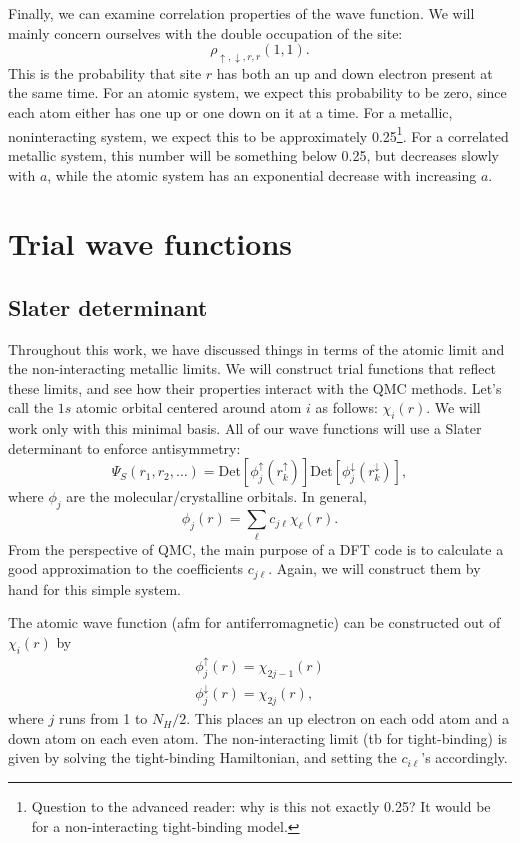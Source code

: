 \documentclass[12pt]{article}
\begin{document}
Finally, we can examine correlation properties of the wave function.
We will mainly concern ourselves with the double occupation of the site:
\begin{equation}
\rho_{\uparrow,\downarrow,r,r}(1,1).	
\end{equation}
This is the probability that site $r$ has both an up and down electron present at the same time.
For an atomic system, we expect this probability to be zero, since each atom either has one up or one down on it at a time.
For a metallic, noninteracting system, we expect this to be approximately 0.25\footnote{Question to the advanced reader: why is this not exactly 0.25? It would be for a non-interacting tight-binding model.}.
For a correlated metallic system, this number will be something below 0.25, but decreases slowly with $a$, while the atomic system has an exponential decrease with increasing $a$.


\section*{Trial wave functions}

\subsection*{Slater determinant} 
Throughout this work, we have discussed things in terms of the atomic limit and the non-interacting metallic limits.
We will construct trial functions that reflect these limits, and see how their properties interact with the QMC methods.
Let's call the $1s$ atomic orbital centered around atom $i$ as follows: $\chi_i(r)$. 
We will work only with this minimal basis.
All of our wave functions will use a Slater determinant to enforce antisymmetry:
\begin{equation}
\Psi_S(r_1,r_2,\ldots)=\text{Det}[\phi_j^\uparrow (r_k^\uparrow)]\text{Det}[\phi_j^\downarrow(r_k^\downarrow)],	
\end{equation}
where $\phi_j$ are the molecular/crystalline orbitals. 
In general,
\begin{equation}
\phi_j(r)=\sum_{\ell} c_{j\ell} \chi_\ell (r).
\end{equation}
From the perspective of QMC, the main purpose of a DFT code is to calculate a good approximation to the coefficients $c_{j\ell}$.
Again, we will construct them by hand for this simple system.

The atomic wave function (afm for antiferromagnetic) can be constructed out of $\chi_i(r)$ by 
\begin{align}
\phi_j^\uparrow(r) = \chi_{2j-1}(r)	\\
\phi_j^\downarrow(r) = \chi_{2j}(r),	
\end{align}
where $j$ runs from 1 to $N_H/2$.
This places an up electron on each odd atom and a down atom on each even atom.
The non-interacting limit (tb for tight-binding) is given by solving the tight-binding Hamiltonian, and setting the $c_{i\ell}$'s accordingly.
\end{document}
